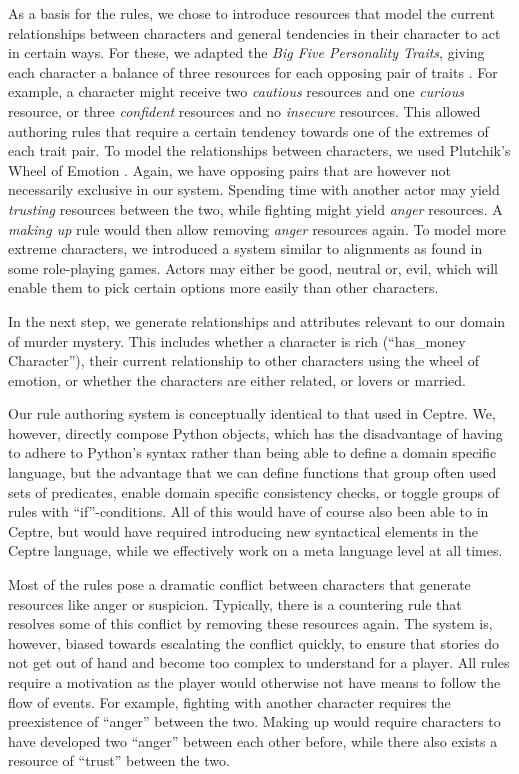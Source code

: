 As a basis for the rules, we chose to introduce resources that model the current relationships between characters and general tendencies in their character to act in certain ways. For these, we adapted the \emph{Big Five Personality Traits}, giving each character a balance of three resources for each opposing pair of traits \cite{rothmann_coetzer_2003}. For example, a character might receive two \emph{cautious} resources and one \emph{curious} resource, or three \emph{confident} resources and no \emph{insecure} resources. This allowed authoring rules that require a certain tendency towards one of the extremes of each trait pair. To model the relationships between characters, we used Plutchik's Wheel of Emotion \cite{plutchik_2001}. Again, we have opposing pairs that are however not necessarily exclusive in our system. Spending time with another actor may yield \emph{trusting} resources between the two, while fighting might yield \emph{anger} resources. A \emph{making up} rule would then allow removing \emph{anger} resources again. To model more extreme characters, we introduced a system similar to alignments as found in some role-playing games. Actors may either be good, neutral or, evil, which will enable them to pick certain options more easily than other characters.

In the next step, we generate relationships and attributes relevant to our domain of murder mystery. This includes whether a character is rich (\enquote{has\_money Character}), their current relationship to other characters using the wheel of emotion, or whether the characters are either related, or lovers or married.

Our rule authoring system is conceptually identical to that used in Ceptre. We, however, directly compose Python objects, which has the disadvantage of having to adhere to Python's syntax rather than being able to define a domain specific language, but the advantage that we can define functions that group often used sets of predicates, enable domain specific consistency checks, or toggle groups of rules with \enquote{if}-conditions. All of this would have of course also been able to in Ceptre, but would have required introducing new syntactical elements in the Ceptre language, while we effectively work on a meta language level at all times.

Most of the rules pose a dramatic conflict between characters that generate resources like anger or suspicion.
Typically, there is a countering rule that resolves some of this conflict by removing these resources again.
The system is, however, biased towards escalating the conflict quickly, to ensure that stories do not get out of hand and become too complex to understand for a player.
All rules require a motivation as the player would otherwise not have means to follow the flow of events.
For example, fighting with another character requires the preexistence of \enquote{anger} between the two.
Making up would require characters to have developed two \enquote{anger} between each other before, while there also exists a resource of \enquote{trust} between the two.

